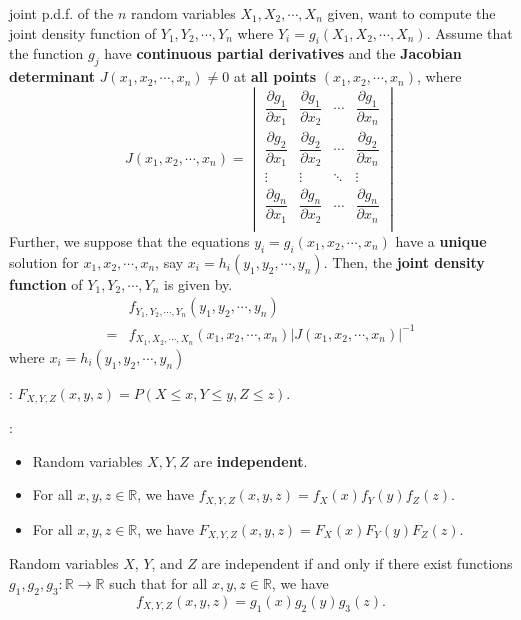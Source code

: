 joint p.d.f. of the \(n\) random
variables \(X_1, X_2, \cdots, X_n\) given, want to compute the joint
density function of \(Y_1, Y_2, \cdots, Y_n\) where \(Y_i = g_i(X_1, X_2,
\cdots, X_n)\). Assume that the function \(g_j\) have \textbf{continuous 
partial derivatives} and the \textbf{Jacobian determinant} 
\(J(x_1, x_2, \cdots, x_n)\neq 0\) at \textbf{all points} 
\((x_1, x_2, \cdots, x_n)\), where 
\[
  J(x_1, x_2, \cdots, x_n) = \begin{vmatrix}
    \dfrac{\partial g_1}{\partial x_1} & \dfrac{\partial g_1}{\partial x_2} &
    \cdots & \dfrac{\partial g_1}{\partial x_n} \\
    \dfrac{\partial g_2}{\partial x_1} & \dfrac{\partial g_2}{\partial x_2} &
    \cdots & \dfrac{\partial g_2}{\partial x_n} \\
    \vdots & \vdots & \ddots & \vdots \\
    \dfrac{\partial g_n}{\partial x_1} & \dfrac{\partial g_n}{\partial x_2} &
    \cdots & \dfrac{\partial g_n}{\partial x_n} \\
  \end{vmatrix}
\]
Further, we suppose that the equations \(y_i\)\(=\)\(g_i(x_1, x_2, \cdots, x_n)\)
have a \textbf{unique} solution for \(x_1, x_2, \cdots, x_n\), say 
\(x_i = h_i(y_1, y_2, \cdots, y_n)\). Then, the \textbf{joint density function}
of \(Y_1, Y_2, \cdots, Y_n\) is given by. 
\begin{align*}
 &f_{Y_1, Y_2, \cdots, Y_n}(y_1, y_2, \cdots, y_n) \\
=& f_{X_1, X_2, \cdots, X_n}(x_1, x_2, \cdots, x_n)|J(x_1, x_2, \cdots,
x_n)|^{-1}
\end{align*}
where \(x_i = h_i(y_1, y_2, \cdots, y_n)\)


: \(F_{X, Y, Z}(x, y, z) = P(X \leq x, Y \leq y, Z \leq
z)\).

:
\begin{itemize}
  \item Random variables \(X, Y, Z\) are \textbf{independent}.
  \item For all \(x,y,z \in \mathbb{R}\), we have \(f_{X, Y, Z}(x,y,z) =
      f_X(x)f_Y(y)f_Z(z).\)
  \item For all \(x, y, z \in \mathbb{R}\), we have 
    \(F_{X, Y, Z}(x, y, z) = F_X(x)F_Y(y)F_Z(z).\)
\end{itemize}

 Random variables \(X\), \(Y\), and \(Z\) are
independent if and only if there exist functions \(g_1, g_2,
g_3:\mathbb{R}\rightarrow \mathbb{R}\) such that for all \(x, y, z \in
\mathbb{R}\), we have
\[f_{X, Y, Z}(x, y, z) = g_1(x)g_2(y)g_3(z).\]

